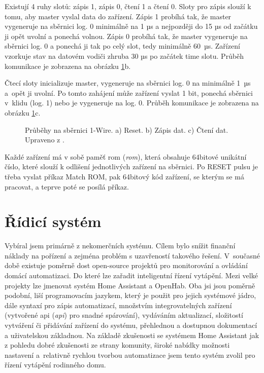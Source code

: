 Existují 4 ruhy slotů: zápis 1, zápis 0, čtení 1 a čtení 0. Sloty pro zápis slouží k tomu, aby master vyslal data do zařízení. Zápis 1 probíhá tak, že master vygeneruje na sběrnici log. 0 minimálně na 1 µs a nejpozději do 15 µs od začátku ji opět uvolní a ponechá volnou. Zápis 0 probíhá tak, že master vygeneruje na sběrnici log. 0 a ponechá ji tak po celý slot, tedy minimálně 60~µs. Zařízení vzorkuje stav na datovém vodiči zhruba 30 µs po začátek time slotu. Průběh komunikace je zobrazena na obrázku \ref{fig:1-wire-reset-vysilani-prijem-dat}b.

Čtecí sloty inicializuje master, vygeneruje na sběrnici log. 0 na minimálně 1~µs a~opět ji uvolní. Po tomto zahájení může zařízení vyslat 1 bit, ponechá sběrnici v~klidu (log. 1) nebo je vygeneruje na log. 0. Průběh komunikace je zobrazena na obrázku \ref{fig:1-wire-reset-vysilani-prijem-dat}c.


\begin{figure}[H]
    \centering
    \def\svgwidth{0.99\columnwidth}
    
    \caption[Průběhy na sběrnici 1-Wire.]{Průběhy na sběrnici 1-Wire.
    a) Reset. b) Zápis dat. c) Čtení dat. Upraveno z \cite{1-wire-sbernice-prubehy}.}
    \label{fig:1-wire-reset-vysilani-prijem-dat}
\end{figure}

Každé zařízení má v sobě paměť \acrshort{rom} (\textit{\acrlong{rom}}), která obsahuje 64bitové unikátní číslo, které slouží k odlišení jednotlivých zařízení na sběrnici. Po RESET pulsu je třeba vyslat příkaz Match ROM, pak 64bitový kód zařízení, se kterým se má pracovat, a teprve poté se posílá příkaz.

\section{Řídicí systém}

Vybíral jsem primárně z nekomerčních systému. Cílem bylo snížit finanční náklady na pořízení a zejména problém s uzavřeností takového řešení. V~současné době existuje poměrně dost open-source projektů pro monitorování a ovládání domácí automatizaci. Do které lze zařadit inteligentní řízení vytápění. Mezi velké projekty lze jmenovat systém Home Assistant a OpenHab. Oba jsi jsou poměrně podobní, liší programovacím jazykem, který je použit pro jejich systémové jádro, dále syntaxí pro zápis automatizací, množstvím integrovatelných zařízení (vytvořené \acrshort{api} (\textit{\acrlong{api}}) pro snadné spárování), vydáváním aktualizací, složitostí vytváření či přidávání zařízení do systému, přehlednou a dostupnou dokumentací a uživatelskou základnou. Na základě zkušenosti se systémem Home Assistant jak z pohledu dobré zkušenosti ze strany komunity, široké nabídky možnosti nastavení a~relativně rychlou tvorbou automatizace jsem tento systém zvolil pro řízení vytápění rodinného domu.

